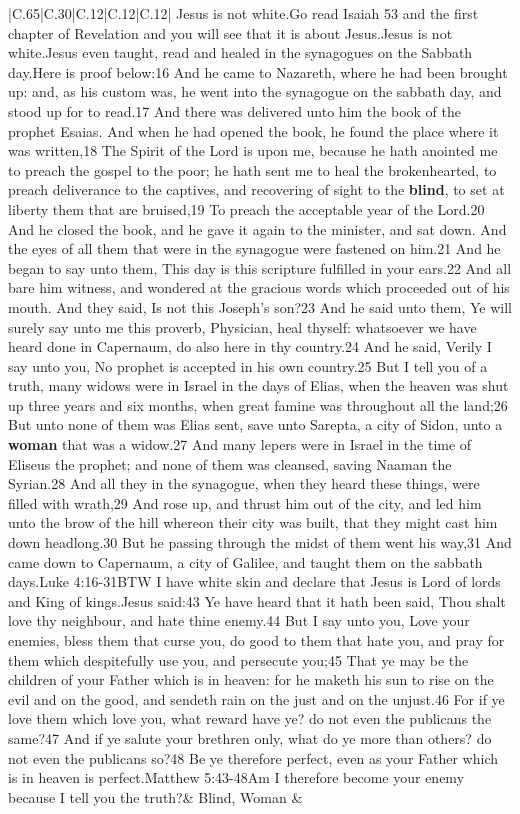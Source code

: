 \documentclass[11pt]{article}
\newlength\mylength
\begin{document}
\begin{center}
\begin{longtable}{|C{.65\mylength}|C{.30\mylength}|C{.12\mylength}|C{.12\mylength}|C{.12\mylength}|}
  \small Jesus is not white.Go read Isaiah 53 and the first chapter of Revelation and you will see that it is about Jesus.Jesus is not white.Jesus even taught, read and healed in the synagogues on the Sabbath day.Here is proof below:16 And he came to Nazareth, where he had been brought up: and, as his custom was, he went into the synagogue on the sabbath day, and stood up for to read.17 And there was delivered unto him the book of the prophet Esaias. And when he had opened the book, he found the place where it was written,18 The Spirit of the Lord is upon me, because he hath anointed me to preach the gospel to the poor; he hath sent me to heal the brokenhearted, to preach deliverance to the captives, and recovering of sight to the \textbf{blind}, to set at liberty them that are bruised,19 To preach the acceptable year of the Lord.20 And he closed the book, and he gave it again to the minister, and sat down. And the eyes of all them that were in the synagogue were fastened on him.21 And he began to say unto them, This day is this scripture fulfilled in your ears.22 And all bare him witness, and wondered at the gracious words which proceeded out of his mouth. And they said, Is not this Joseph's son?23 And he said unto them, Ye will surely say unto me this proverb, Physician, heal thyself: whatsoever we have heard done in Capernaum, do also here in thy country.24 And he said, Verily I say unto you, No prophet is accepted in his own country.25 But I tell you of a truth, many widows were in Israel in the days of Elias, when the heaven was shut up three years and six months, when great famine was throughout all the land;26 But unto none of them was Elias sent, save unto Sarepta, a city of Sidon, unto a \textbf{woman} that was a widow.27 And many lepers were in Israel in the time of Eliseus the prophet; and none of them was cleansed, saving Naaman the Syrian.28 And all they in the synagogue, when they heard these things, were filled with wrath,29 And rose up, and thrust him out of the city, and led him unto the brow of the hill whereon their city was built, that they might cast him down headlong.30 But he passing through the midst of them went his way,31 And came down to Capernaum, a city of Galilee, and taught them on the sabbath days.Luke 4:16-31BTW I have white skin and declare that Jesus is Lord of lords and King of kings.Jesus said:43 Ye have heard that it hath been said, Thou shalt love thy neighbour, and hate thine enemy.44 But I say unto you, Love your enemies, bless them that curse you, do good to them that hate you, and pray for them which despitefully use you, and persecute you;45 That ye may be the children of your Father which is in heaven: for he maketh his sun to rise on the evil and on the good, and sendeth rain on the just and on the unjust.46 For if ye love them which love you, what reward have ye? do not even the publicans the same?47 And if ye salute your brethren only, what do ye more than others? do not even the publicans so?48 Be ye therefore perfect, even as your Father which is in heaven is perfect.Matthew 5:43-48Am I therefore become your enemy because I tell you the truth?\normalsize   & Blind, Woman & 
\end{longtable}
\end{center}
\end{document}
